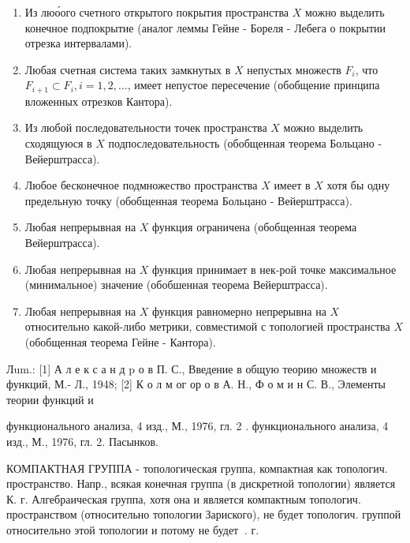 \documentclass[10pt]{article}
\begin{document}
\begin{enumerate}

  \item Из люо́ого счетного открытого покрытия пространства $X$ можно выделить конечное подпокрытие (аналог леммы Гейне - Бореля - Лебега о покрытии отрезка интервалами).



  \item Любая счетная система таких замкнутых в $X$ непустых множеств $F_{i}$, что $F_{i+1} \subset F_{i}, i=1,2, \ldots$, имеет непустое пересечение (обобщение принципа вложенных отрезков Кантора).



  \item Из любой последовательности точек пространства $X$ можно выделить сходящуюся в $X$ подпоследовательность (обобщенная теорема Больцано - Вейерштрасса).



  \item Любое бесконечное подмножество пространства $X$ имеет в $X$ хотя бы одну предельную точку (обобщенная теорема Больцано - Вейерштрасса).



  \item Любая непрерывная на $X$ функция ограничена (обобщенная теорема Вейерштрасса).



  \item Любая непрерывная на $X$ функция принимает в нек-рой точке максимальное (минимальное) значение (обобшенная теорема Вейерштрасса).



  \item Любая непрерывная на $X$ функция равномерно непрерывна на $X$ относительно какой-либо метрики, совместимой с топологией пространства $X$ (обобщенная теорема Гейне - Кантора).



\end{enumerate}



Лum.: [1] А л е к с а н д p о в П. С., Введение в общую теорию множеств и функций, М.- Л., 1948; [2] К о л м ог ор о в А. Н., Ф о м и н С. В., Элементы теории функций и

функционального анализа, 4 изд., М., 1976, гл. 2 . функционального анализа, 4 изд., М., 1976, гл. 2. Пасынков.



КОМПАКТНАЯ ГРУППА - топологическая группа, компактная как топологич. пространство. Напр., всякая конечная группа (в дискретной топологии) является К. г. Алгебраическая группа, хотя она и является компактным топологич. пространством (относительно топологии Зариского), не будет топологич. группой относительно этой топологии и потому не будет $\mathcal{~}$. г.
\end{document}
